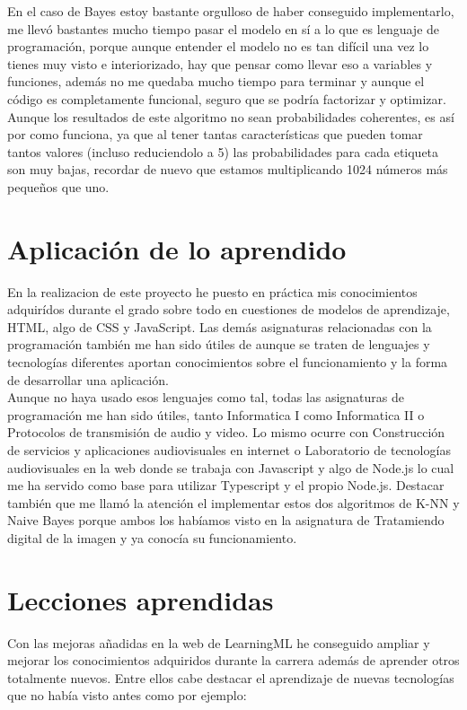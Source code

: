 \documentclass[a4paper, 12pt]{book}
\begin{document}
En el caso de Bayes estoy bastante orgulloso de haber conseguido implementarlo, me llevó bastantes mucho tiempo pasar el modelo en sí a lo que es lenguaje de programación, porque aunque entender el modelo no es tan difícil una vez lo tienes muy visto e interiorizado, hay que pensar como llevar eso a variables y funciones, además no me quedaba mucho tiempo para terminar y aunque el código es completamente funcional, seguro que se podría factorizar y optimizar. Aunque los resultados de este algoritmo no sean probabilidades coherentes, es así por como funciona, ya que al tener tantas características que pueden tomar tantos valores (incluso reduciendolo a 5) las probabilidades para cada etiqueta son muy bajas, recordar de nuevo que estamos multiplicando 1024 números más pequeños que uno.


\section{Aplicación de lo aprendido}
\label{sec:aplicacion}

En la realizacion de este proyecto he puesto en práctica mis conocimientos adquirídos durante el grado sobre todo en cuestiones de modelos de aprendizaje, HTML, algo de CSS y JavaScript. Las demás asignaturas relacionadas con la programación también me han sido útiles de aunque se traten de lenguajes y tecnologías diferentes aportan conocimientos sobre el funcionamiento y la forma de desarrollar una aplicación.\\
Aunque no haya usado esos lenguajes como tal, todas las asignaturas de programación me han sido útiles, tanto Informatica I como Informatica II o Protocolos de transmisión de audio y video. Lo mismo ocurre con Construcción de servicios y aplicaciones audiovisuales en internet o Laboratorio de tecnologías audiovisuales en la web donde se trabaja con Javascript y algo de Node.js lo cual me ha servido como base para utilizar Typescript y el propio Node.js.
Destacar también que me llamó la atención el implementar estos dos algoritmos de K-NN y Naive Bayes porque ambos los habíamos visto en la asignatura de Tratamiendo digital de la imagen y ya conocía su funcionamiento.

\section{Lecciones aprendidas}
\label{sec:lecciones_aprendidas}

Con las mejoras añadidas en la web de LearningML he conseguido ampliar y mejorar los conocimientos adquiridos durante la carrera además de aprender otros totalmente nuevos. Entre ellos cabe destacar el aprendizaje de nuevas tecnologías que no había visto antes como por ejemplo:
\end{document}
